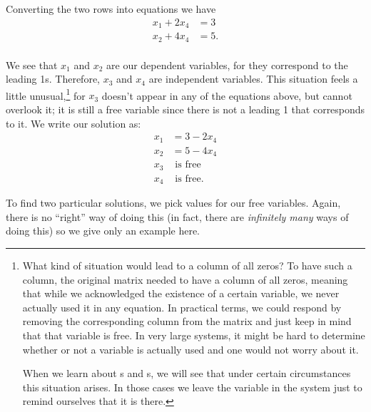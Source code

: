 {Converting the two rows into equations we have \begin{align*} x_1 + 2x_4 &= 3 \\ x_2 + 4x_4&=5.\\ \end{align*}

We see that $x_1$ and $x_2$ are our dependent variables, for they correspond to the leading 1s. Therefore, $x_3$ and $x_4$ are independent variables. This situation feels a little unusual,\footnote{What kind of situation would lead to a column of all zeros? To have such a column, the original matrix needed to have a column of all zeros, meaning that while we acknowledged the existence of a certain variable, we never actually used it in any equation. In practical terms, we could respond by removing the corresponding column from the matrix and just keep in mind that that variable is free. In very large systems, it might be hard to determine whether or not a variable is actually used and one would not worry about it.

When we learn about \ev s and \el s, we will see that under certain circumstances this situation arises. In those cases we leave the variable in the system just to remind ourselves that it is there.\label{footnote:extra_zeros}} for $x_3$ doesn't appear in any of the equations above, but cannot overlook it; it is still a free variable since there is not a leading 1 that corresponds to it. We write our solution as:
\begin{align*} x_1 &= 3-2x_4 \\ x_2 &=5-4x_4 \\ x_3 & \text{ is free} \\ x_4 &  \text{ is free}. \end{align*}

To find two particular solutions, we pick values for our free variables. Again, there is no ``right'' way of doing this (in fact, there are \emph{infinitely many} ways of doing this) so we give only an example here.

}
